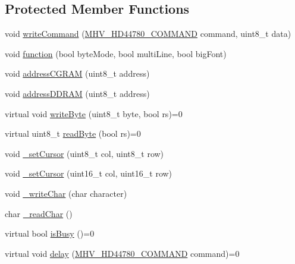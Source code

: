 \subsection*{\-Protected \-Member \-Functions}
\begin{DoxyCompactItemize}
\item 
void \hyperlink{class_m_h_v___display___h_d44780_a99ad2131b4ea26638a75f865a740c7ed}{write\-Command} (\hyperlink{_m_h_v___display___h_d44780_8h_a76bff68a0c366080486a09e3beec77e1}{\-M\-H\-V\-\_\-\-H\-D44780\-\_\-\-C\-O\-M\-M\-A\-N\-D} command, uint8\-\_\-t data)
\item 
void \hyperlink{class_m_h_v___display___h_d44780_ab8c89d4e57ae1008ab553e2f890129a3}{function} (bool byte\-Mode, bool multi\-Line, bool big\-Font)
\item 
void \hyperlink{class_m_h_v___display___h_d44780_a9e601dd017a6d9f4e2bdc37efe49a13d}{address\-C\-G\-R\-A\-M} (uint8\-\_\-t address)
\item 
void \hyperlink{class_m_h_v___display___h_d44780_af8eb6f055b4a28b63422a53e6d4190e7}{address\-D\-D\-R\-A\-M} (uint8\-\_\-t address)
\item 
virtual void \hyperlink{class_m_h_v___display___h_d44780_ad1691510b6d35301e4182edcf11d81db}{write\-Byte} (uint8\-\_\-t byte, bool rs)=0
\item 
virtual uint8\-\_\-t \hyperlink{class_m_h_v___display___h_d44780_a5f35b3083cca3fb405b4f56a631cbc63}{read\-Byte} (bool rs)=0
\item 
void \hyperlink{class_m_h_v___display___h_d44780_ab59dcf627ffb487a0a63e92cdfce7373}{\-\_\-set\-Cursor} (uint8\-\_\-t col, uint8\-\_\-t row)
\item 
void \hyperlink{class_m_h_v___display___h_d44780_a70c2bd4ead6aa04eb0f198842ea7c278}{\-\_\-set\-Cursor} (uint16\-\_\-t col, uint16\-\_\-t row)
\item 
void \hyperlink{class_m_h_v___display___h_d44780_a7a46e31a6ee22db0cf3132630eb88554}{\-\_\-write\-Char} (char character)
\item 
char \hyperlink{class_m_h_v___display___h_d44780_ad0fb71213a916a4a85fedf8f5d25316e}{\-\_\-read\-Char} ()
\item 
virtual bool \hyperlink{class_m_h_v___display___h_d44780_a667d9f8ca08b3021fea77a47cf6c1965}{is\-Busy} ()=0
\item 
virtual void \hyperlink{class_m_h_v___display___h_d44780_a8a6017accb4910deb470ce2d1a5b5fc5}{delay} (\hyperlink{_m_h_v___display___h_d44780_8h_a76bff68a0c366080486a09e3beec77e1}{\-M\-H\-V\-\_\-\-H\-D44780\-\_\-\-C\-O\-M\-M\-A\-N\-D} command)=0
\end{DoxyCompactItemize}
